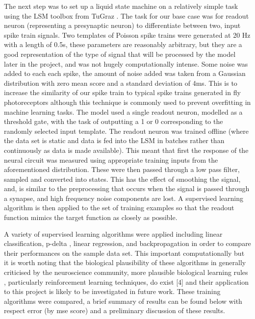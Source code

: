 \documentclass[fleqn,12pt]{wlscirep}
\begin{document}
The next step was to set up a liquid state machine on a relatively simple task using the LSM toolbox from TuGraz \cite{noauthor_neural_nodate}. The task for our base case was for readout neuron (representing a presynaptic neuron) to differentiate between two, input spike train signals. Two templates of Poisson spike trains were generated at 20 Hz with a length of 0.5s, these parameters are reasonably arbitrary, but they are a good representation of the type of signal that will be processed by the model later in the project, and was not hugely computationally intense. Some noise was added to each each spike, the amount of noise added was taken from a Gaussian distribution with zero mean score and a standard deviation of 4ms. This is to increase the similarity of our spike train to typical spike trains generated in fly photoreceptors \cite{song_stochastic_2012} although this technique is commonly used to prevent overfitting in machine learning tasks. The model used a single readout neuron, modelled as a threshold gate, with the task of outputting a 1 or 0 corresponding to the randomly selected input template. The readout neuron was trained offline (where the data set is static and data is fed into the LSM in batches rather than continuously as data is made available). This meant that first the response of the neural circuit was measured using appropriate training inputs from the aforementioned distribution. These were then passed through a low pass filter, sampled and converted into states. This has the effect of smoothing the signal, and, is similar to the preprocessing that occurs when the signal is passed through a synapse, and high frequency noise components are lost. A supervised learning algorithm is then applied to the set of training examples so that the readout function mimics the target function as closely as possible.

 A variety of supervised learning algorithms were applied including linear classification, p-delta \cite{auer_p-delta_nodate}
 , linear regression, and backpropagation in order to compare their performances on the sample data set. This important computationally but it is worth noting that the biological plausibility of these algorithms in generally criticised by the neuroscience community, more plausible biological learning rules , particularly reinforcement learning techniques, do exist [4] and their application to this project is likely to be investigated in future work. These training algorithms were compared, a brief summary of results can be found below with respect error (by mse score) and a preliminary discussion of these results.
\end{document}
